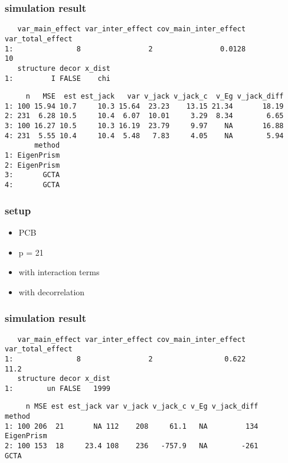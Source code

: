 \documentclass[]{article}
\providecommand{\tightlist}{%
  \setlength{\itemsep}{0pt}\setlength{\parskip}{0pt}}
\begin{document}
\subsubsection{simulation result}\label{simulation-result-1}

\begin{verbatim}
   var_main_effect var_inter_effect cov_main_inter_effect var_total_effect
1:               8                2                0.0128               10
   structure decor x_dist
1:         I FALSE    chi
\end{verbatim}

\begin{verbatim}
     n   MSE  est est_jack   var v_jack v_jack_c  v_Eg v_jack_diff
1: 100 15.94 10.7     10.3 15.64  23.23    13.15 21.34       18.19
2: 231  6.28 10.5     10.4  6.07  10.01     3.29  8.34        6.65
3: 100 16.27 10.5     10.3 16.19  23.79     9.97    NA       16.88
4: 231  5.55 10.4     10.4  5.48   7.83     4.05    NA        5.94
       method
1: EigenPrism
2: EigenPrism
3:       GCTA
4:       GCTA
\end{verbatim}

\subsubsection{setup}\label{setup-4}

\begin{itemize}
\tightlist
\item
  PCB
\item
  p = 21
\item
  with interaction terms
\item
  with decorrelation
\end{itemize}

\subsubsection{simulation result}\label{simulation-result-2}

\begin{verbatim}
   var_main_effect var_inter_effect cov_main_inter_effect var_total_effect
1:               8                2                 0.622             11.2
   structure decor x_dist
1:        un FALSE   1999
\end{verbatim}

\begin{verbatim}
     n MSE est est_jack var v_jack v_jack_c v_Eg v_jack_diff     method
1: 100 206  21       NA 112    208     61.1   NA         134 EigenPrism
2: 100 153  18     23.4 108    236   -757.9   NA        -261       GCTA
\end{verbatim}
\end{document}
